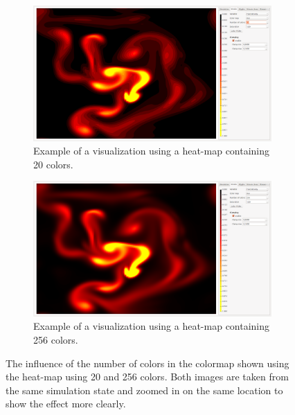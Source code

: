 \begin{figure}[tb]
	\centering
	\begin{subfigure}[t]{0.4\textwidth}
		\centering
		\includegraphics[width=\textwidth, trim={235px 30px 1230px 830px}, clip]{colormapping/img/heat20}
		\caption{Example of a visualization using a heat-map containing 20 colors.}
		\label{fig:colormapping:banding:20}
	\end{subfigure}
	\hspace{50px}
	\begin{subfigure}[t]{0.4\textwidth}
		\centering
		\includegraphics[width=\textwidth, trim={235px 30px 1230px 830px}, clip]{colormapping/img/heat256}
		\caption{Example of a visualization using a heat-map containing 256 colors.}
		\label{fig:colormapping:banding:256}
	\end{subfigure}	
	\caption{The influence of the number of colors in the colormap shown using the heat-map using 20  and 256  colors. Both images are taken from the same simulation state and zoomed in on the same location to show the effect more clearly.}
	\label{fig:colormaps:banding}
\end{figure}

